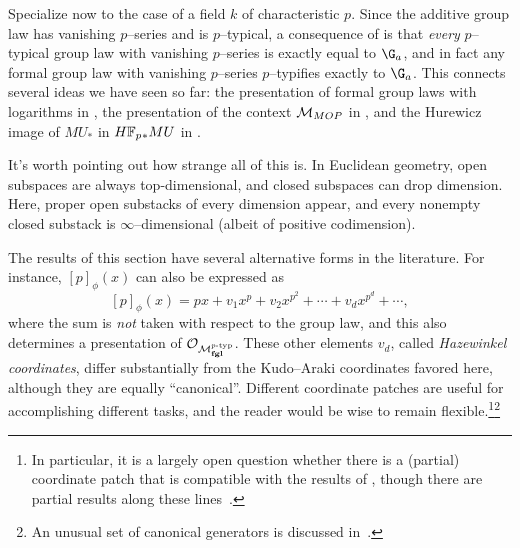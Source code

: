 \begin{remark}
Specialize now to the case of a field \(k\) of characteristic \(p\).  Since the additive group law has vanishing \(p\)--series and is \(p\)--typical, a consequence of  is that \emph{every} \(p\)--typical group law with vanishing \(p\)--series is exactly equal to \(\G_a\), and in fact any formal group law with vanishing \(p\)--series \(p\)--typifies exactly to \(\G_a\).  This connects several ideas we have seen so far: the presentation of formal group laws with logarithms in , the presentation of the context \(\mathcal{M}_{MOP}\) in , and the Hurewicz image of \(MU_*\) in \(\HFp_* MU\) in .
\end{remark}

\begin{remark}
It's worth pointing out how strange all of this is. In Euclidean geometry, open subspaces are always top-dimensional, and closed subspaces can drop dimension.  Here, proper open substacks of every dimension appear, and every nonempty closed substack is \(\infty\)--dimensional (albeit of positive codimension).
\end{remark}

\begin{remark}
The results of this section have several alternative forms in the literature.  For instance, \([p]_\phi(x)\) can also be expressed as \[[p]_\phi(x) = px + v_1 x^p + v_2 x^{p^2} + \cdots + v_d x^{p^d} + \cdots,\] where the sum is \emph{not} taken with respect to the group law, and this also determines a presentation of \(\mathcal{O}_{\mathcal{M}_{\mathbf{fgl}}^{\mathit{p}\text{-}\mathrm{typ}}}\).  These other elements \(v_d\), called \textit{Hazewinkel coordinates}, differ substantially from the Kudo--Araki coordinates favored here, although they are equally ``canonical''.  Different coordinate patches are useful for accomplishing different tasks, and the reader would be wise to remain flexible.\footnote{In particular, it is a largely open question whether there is a (partial) coordinate patch that is compatible with the results of , though there are partial results along these lines~\cite{JohnsonNoel,LawsonSecondaryPowerOps,LawsonNaumann,StricklandProductsOnModules}.}\footnote{An unusual set of canonical generators is discussed in~\cite[Section V.10]{LazardCFGs}.}
\end{remark}

